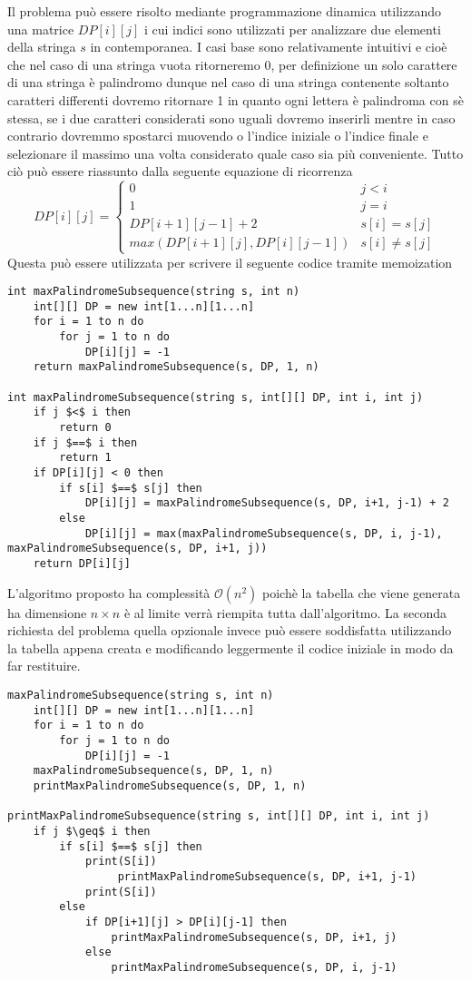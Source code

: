 \documentclass[../cheatSheetAlgoritmi.tex]{subfiles}
\begin{document}
Il problema può essere risolto mediante programmazione dinamica utilizzando una matrice $DP[i][j]$ i cui indici sono utilizzati per analizzare due elementi della stringa $s$ in contemporanea. I casi base sono relativamente intuitivi e cioè che nel caso di una stringa vuota ritorneremo 0, per definizione un solo carattere di una stringa è palindromo dunque nel caso di una stringa contenente soltanto caratteri differenti dovremo ritornare 1 in quanto ogni lettera è palindroma con sè stessa, se i due caratteri considerati sono uguali dovremo inserirli mentre in caso contrario dovremmo spostarci muovendo o l'indice iniziale o l'indice finale e selezionare il massimo una volta considerato quale caso sia più conveniente. Tutto ciò può essere riassunto dalla seguente equazione di ricorrenza
\begin{equation*}
  	DP[i][j]=\begin{cases}
  		0 & \text{$j < i$}\\
  		1 & \text{$j = i$}\\
  		DP[i+1][j-1] + 2 &\text{$s[i] = s[j]$}\\
  		max(DP[i+1][j], DP[i][j-1]) & \text{$s[i] \neq s[j]$}
  	\end{cases}
\end{equation*}
Questa può essere utilizzata per scrivere il seguente codice tramite memoization
\begin{lstlisting}[caption=Sottosequenza Palindroma Massimale]
int maxPalindromeSubsequence(string s, int n)
	int[][] DP = new int[1...n][1...n]
	for i = 1 to n do
		for j = 1 to n do
			DP[i][j] = -1
	return maxPalindromeSubsequence(s, DP, 1, n)
	
int maxPalindromeSubsequence(string s, int[][] DP, int i, int j)
	if j $<$ i then
		return 0
	if j $==$ i then
		return 1
	if DP[i][j] < 0 then
		if s[i] $==$ s[j] then
			DP[i][j] = maxPalindromeSubsequence(s, DP, i+1, j-1) + 2
		else 
			DP[i][j] = max(maxPalindromeSubsequence(s, DP, i, j-1), maxPalindromeSubsequence(s, DP, i+1, j)) 
	return DP[i][j]
\end{lstlisting}
L'algoritmo proposto ha complessità $\mathcal{O}(n^{2})$ poichè la tabella che viene generata ha dimensione $n \times n$ è al limite verrà riempita tutta dall'algoritmo. La seconda richiesta del problema quella opzionale invece può essere soddisfatta utilizzando la tabella appena creata e modificando leggermente il codice iniziale in modo da far restituire.
\begin{lstlisting}[caption=Stampa Sottosequenza Palindroma Massimale]
maxPalindromeSubsequence(string s, int n)
	int[][] DP = new int[1...n][1...n]
	for i = 1 to n do
		for j = 1 to n do
			DP[i][j] = -1
	maxPalindromeSubsequence(s, DP, 1, n)
	printMaxPalindromeSubsequence(s, DP, 1, n)
	
printMaxPalindromeSubsequence(string s, int[][] DP, int i, int j)
	if j $\geq$ i then 
		if s[i] $==$ s[j] then
			print(S[i])
				 printMaxPalindromeSubsequence(s, DP, i+1, j-1)
			print(S[i])
		else 
			if DP[i+1][j] > DP[i][j-1] then
				printMaxPalindromeSubsequence(s, DP, i+1, j)
			else
				printMaxPalindromeSubsequence(s, DP, i, j-1)
\end{lstlisting}
\end{document}
